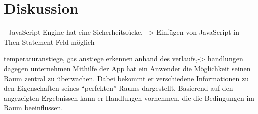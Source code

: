 \chapter{Diskussion}

- JavaScript Engine hat eine Sicherheitslücke. --> Einfügen von JavaScript in Then Statement Feld möglich

temperaturanstiege, gas anstiege erkennen anhand des verlaufs,-> handlungen dagegen unternehmen
Mithilfe der App hat ein Anwender die Möglichkeit seinen Raum zentral zu überwachen. Dabei bekommt er verschiedene Informationen zu den Eigenschaften seines \enquote{perfekten} Raums dargestellt. Basierend auf den angezeigten Ergebnissen kann er Handlungen vornehmen, die die Bedingungen im Raum beeinflussen. 